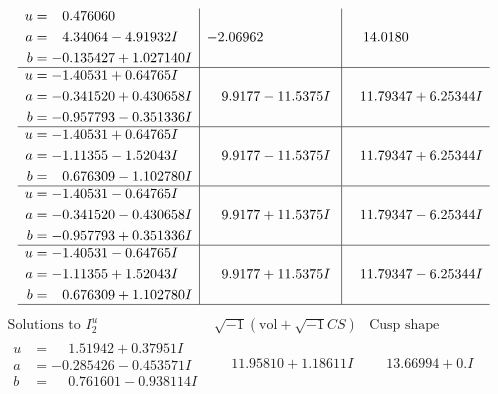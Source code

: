 \documentclass[1p]{elsarticle_modified}
\theoremstyle{definition}
\newcommand{\I}{\sqrt{-1}}
\begin{document}
$$\begin{array}{c|c|c}
\begin{aligned}
u &= \phantom{-}0.476060\phantom{ +0.000000I} \\
a &= \phantom{-}4.34064 - 4.91932 I \\
b &= -0.135427 + 1.027140 I\end{aligned}
 & -2.06962\phantom{ +0.000000I} & \phantom{-}14.0180\phantom{ +0.000000I} \\ \hline\begin{aligned}
u &= -1.40531 + 0.64765 I \\
a &= -0.341520 + 0.430658 I \\
b &= -0.957793 - 0.351336 I\end{aligned}
 & \phantom{-}9.9177 - 11.5375 I & \phantom{-}11.79347 + 6.25344 I \\ \hline\begin{aligned}
u &= -1.40531 + 0.64765 I \\
a &= -1.11355 - 1.52043 I \\
b &= \phantom{-}0.676309 - 1.102780 I\end{aligned}
 & \phantom{-}9.9177 - 11.5375 I & \phantom{-}11.79347 + 6.25344 I \\ \hline\begin{aligned}
u &= -1.40531 - 0.64765 I \\
a &= -0.341520 - 0.430658 I \\
b &= -0.957793 + 0.351336 I\end{aligned}
 & \phantom{-}9.9177 + 11.5375 I & \phantom{-}11.79347 - 6.25344 I \\ \hline\begin{aligned}
u &= -1.40531 - 0.64765 I \\
a &= -1.11355 + 1.52043 I \\
b &= \phantom{-}0.676309 + 1.102780 I\end{aligned}
 & \phantom{-}9.9177 + 11.5375 I & \phantom{-}11.79347 - 6.25344 I\\
 \hline 
 \end{array}$$\newpage$$\begin{array}{c|c|c}  
\text{Solutions to }I^u_{2}& \I (\text{vol} + \sqrt{-1}CS) & \text{Cusp shape}\\
 \hline 
\begin{aligned}
u &= \phantom{-}1.51942 + 0.37951 I \\
a &= -0.285426 - 0.453571 I \\
b &= \phantom{-}0.761601 - 0.938114 I\end{aligned}
 & \phantom{-}11.95810 + 1.18611 I & \phantom{-}13.66994 + 0. I\phantom{ +0.000000I} \\ \hline\begin{aligned}

\end{aligned}
\end{array}$$
\end{document}
